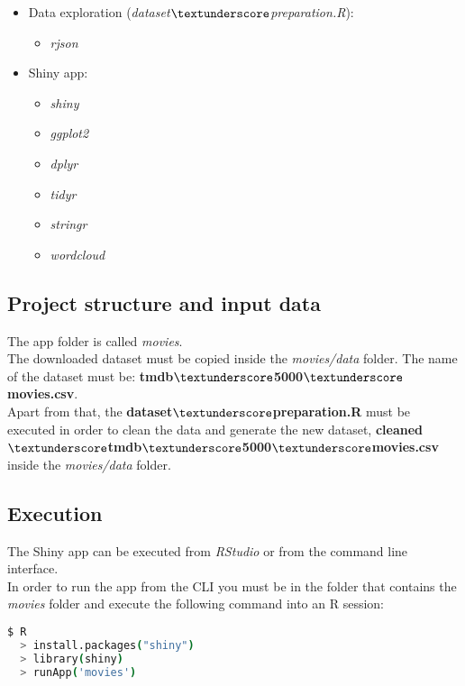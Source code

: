 \begin{itemize}
	\item Data exploration (\textit{dataset$\textunderscore$preparation.R}):
		\begin{itemize}
			\item \textit{rjson}
		\end{itemize}
	\item Shiny app:
		\begin{itemize}
			\item \textit{shiny}
			\item \textit{ggplot2}
			\item \textit{dplyr}
			\item \textit{tidyr}
			\item \textit{stringr}
			\item \textit{wordcloud}
		\end{itemize}
\end{itemize}

\subsection{Project structure and input data}

The app folder is called \textit{movies}.\\

The downloaded dataset must be copied inside the \textit{movies/data} folder. The name of the dataset must be: \textbf{tmdb$\textunderscore$5000$\textunderscore$movies.csv}.\\

Apart from that, the \textbf{dataset$\textunderscore$preparation.R} must be executed in order to clean the data and generate the new dataset, \textbf{cleaned$\textunderscore$tmdb$\textunderscore$5000$\textunderscore$movies.csv} inside the \textit{movies/data} folder.\\

\subsection{Execution}

The Shiny app can be executed from \textit{RStudio} or from the command line interface. \\

In order to run the app from the CLI you must be in the folder that contains the \textit{movies} folder and execute the following command into an R session:

\noindent
\begin{lstlisting}[language=bash]
  $ R 
  > install.packages("shiny")
  > library(shiny)
  > runApp('movies')
\end{lstlisting}

